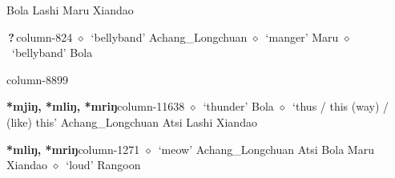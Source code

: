 \hspace{1ex}
         Bola 
\hspace{1ex}
         Lashi 
\hspace{1ex}
         Maru 
\hspace{1ex}
         Xiandao 
  \item {\footnotesize \textbf{\,?\,}}{\tiny column-824}
         $\diamond$~`bellyband'
         Achang\_Longchuan 
\hspace{1ex}
         $\diamond$~`manger'
         Maru 
\hspace{1ex}
         $\diamond$~`bellyband'
         Bola 
  \item {\footnotesize \textbf{}}{\tiny column-8899}
  \item {\footnotesize \textbf{*mjiŋ, *mliŋ, *mriŋ}}{\tiny column-11638}
         $\diamond$~`thunder'
         Bola 
\hspace{1ex}
         $\diamond$~`thus / this (way) / (like) this'
         Achang\_Longchuan 
\hspace{1ex}
         Atsi 
\hspace{1ex}
         Lashi 
\hspace{1ex}
         Xiandao 
  \item {\footnotesize \textbf{*mliŋ, *mriŋ}}{\tiny column-1271}
         $\diamond$~`meow'
         Achang\_Longchuan 
\hspace{1ex}
         Atsi 
\hspace{1ex}
         Bola 
\hspace{1ex}
         Maru 
\hspace{1ex}
         Xiandao 
\hspace{1ex}
         $\diamond$~`loud'
         Rangoon 
\hspace{1ex}
